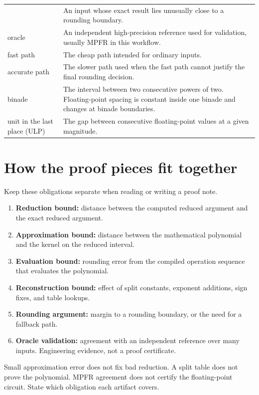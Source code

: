 \documentclass[manuscript, nonacm]{acmart}
\begin{document}
\begin{table}[H]
\begin{tabular}{p{3.8cm}p{8.5cm}}
            & An input whose exact result lies unusually close to a rounding
            boundary. \\
            oracle
            & An independent high-precision reference used for validation, usually
            MPFR in this workflow. \\
            fast path
            & The cheap path intended for ordinary inputs.                      \\
            accurate path
            & The slower path used when the fast path cannot justify the final
            rounding decision. \\
            binade
            & The interval between two consecutive powers of two. Floating-point
            spacing is constant inside one binade and changes at binade boundaries. \\
            unit in the last place (ULP)
            & The gap between consecutive floating-point values at a given
            magnitude. \\
            \bottomrule
        \end{tabular}
    \end{table}



    \section{How the proof pieces fit together}

    Keep these obligations separate when reading or writing a proof note.

    \begin{enumerate}
        \item \textbf{Reduction bound:} distance between the computed reduced
        argument and the exact reduced argument.
        \item \textbf{Approximation bound:} distance between the mathematical
        polynomial and the kernel on the reduced interval.
        \item \textbf{Evaluation bound:} rounding error from the compiled operation
        sequence that evaluates the polynomial.
        \item \textbf{Reconstruction bound:} effect of split constants, exponent
        additions, sign fixes, and table lookups.
        \item \textbf{Rounding argument:} margin to a rounding boundary, or the need
        for a fallback path.
        \item \textbf{Oracle validation:} agreement with an independent reference
        over many inputs. Engineering evidence, not a proof certificate.
    \end{enumerate}

    Small approximation error does not fix bad reduction. A split table does
    not prove the polynomial. MPFR agreement does not certify the floating-point
    circuit. State which obligation each artifact covers.

    \clearpage
    
    
\end{document}
